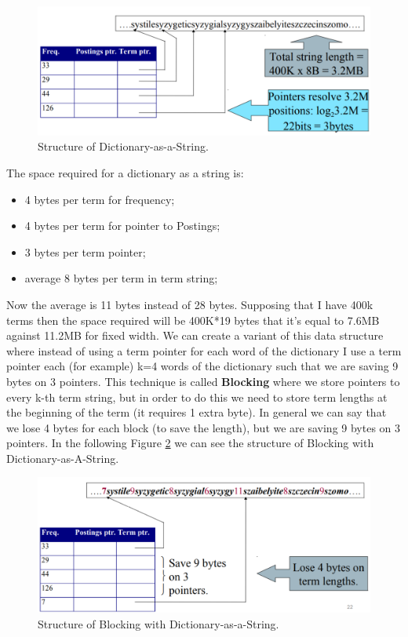 \begin{figure}
    \centering
    \includegraphics[width=0.75\linewidth]{images/dictionaryasastring.png}
    \caption{Structure of Dictionary-as-a-String.}
    \label{fig:dictionaryasastring}
\end{figure}
The space required for a dictionary as a string is:
\begin{itemize}
    \item 4 bytes per term for frequency;
    \item 4 bytes per term for pointer to Postings;
    \item 3 bytes per term pointer;
    \item average 8 bytes per term in term string;
\end{itemize}
Now the average is 11 bytes instead of 28 bytes. Supposing that I have 400k terms then the space required will be 400K*19 bytes that it's equal to 7.6MB against 11.2MB for fixed width.\newline
We can create a variant of this data structure where instead of using a term pointer for each word of the dictionary I use a term pointer each (for example) k=4 words of the dictionary such that we are saving 9 bytes on 3 pointers. This technique is called \textbf{Blocking} where we store pointers to every k-th term string, but in order to do this we need to store term lengths at the beginning of the term (it requires 1 extra byte). In general we can say that we lose 4 bytes for each block (to save the length), but we are saving 9 bytes on 3 pointers. In the following Figure \ref{fig:blocking} we can see the structure of Blocking with Dictionary-as-A-String.\newline
\begin{figure}
    \centering
    \includegraphics[width=0.75\linewidth]{images/blocking.png}
    \caption{Structure of Blocking with Dictionary-as-a-String.}
    \label{fig:blocking}
\end{figure}
